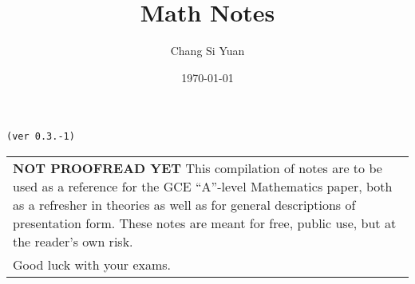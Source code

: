 \documentclass[../main]{subfiles}
\begin{document}
\author{Chang Si Yuan}
\title{Math Notes}
\date{\today}

\maketitle

\begin{center}

	\texttt{(ver 0.3.-1)}

	\vspace{50pt}

	\begin{tabular}{>{\flushleft}p{8cm}}
	\textbf{NOT PROOFREAD YET}
	This compilation of notes are to be used as a reference for the GCE ``A''-level Mathematics paper, both as a refresher in theories as well as for general descriptions of presentation form. These notes are meant for free, public use, but at the reader's own risk. \\
	Good luck with your exams.
	\end{tabular}

	\vspace{50pt}

\end{center}

\newpage
\end{document}

